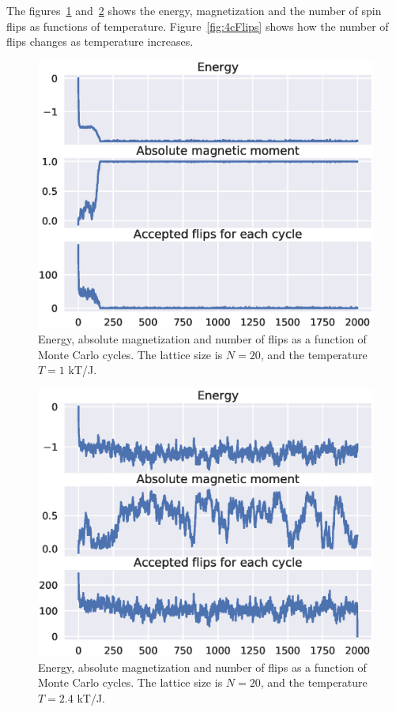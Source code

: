 \documentclass[aps,reprint]{revtex4-1}
\begin{document}
The figures~\ref{fig:L20T1Random} and~\ref{fig:L20T24Random} shows the energy,
magnetization and the number of spin flips as functions of temperature.
Figure~\ref{fig:4cFlips} shows how the number of flips changes as temperature increases.
\begin{figure}
  \includegraphics[width=\columnwidth]{figures/L20T1_random.eps}
  \caption{Energy, absolute magnetization and number of flips as a function of
  Monte Carlo cycles. The lattice size is $N = 20$, and the temperature $T = 1$ kT/J.}
  \label{fig:L20T1Random}
\end{figure}
\begin{figure}
  \includegraphics[width=\columnwidth]{figures/L20T2_4_random.eps}
  \caption{Energy, absolute magnetization and number of flips as a function of
  Monte Carlo cycles. The lattice size is $N = 20$, and the temperature $T = 2.4$ kT/J.}
  \label{fig:L20T24Random}
\end{figure}
\end{document}
